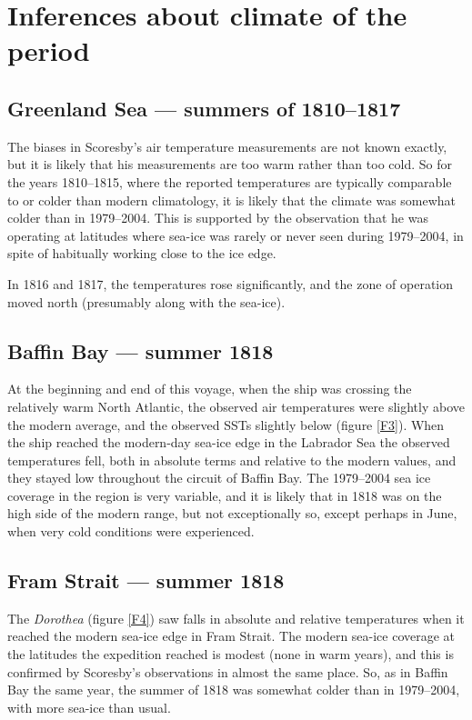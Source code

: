 \documentclass[CP]{copernicus}
\begin{document}
\section{Inferences about climate of the period}

\subsection{Greenland Sea --- summers of 1810--1817}

The biases in Scoresby's air temperature measurements are not known exactly, but it is likely that his measurements are too warm rather than too cold. So for the years 1810--1815, where the reported temperatures are typically comparable to or colder than modern climatology, it is likely that the climate was somewhat colder than in 1979--2004. This is supported by the observation that he was operating at latitudes where sea-ice was rarely or never seen during 1979--2004, in spite of habitually working close to the ice edge.

In 1816 and 1817, the temperatures rose significantly, and the zone of operation moved north (presumably along with the sea-ice).

\subsection{Baffin Bay --- summer 1818}

At the beginning and end of this voyage, when the ship was crossing the relatively warm North Atlantic, the observed air temperatures were slightly above the modern average, and the observed SSTs slightly below (figure \ref{F3}). When the ship reached the modern-day sea-ice edge in the Labrador Sea the observed temperatures fell, both in absolute terms and relative to the modern values, and they stayed low throughout the circuit of Baffin Bay. The 1979--2004 sea ice coverage in the region is very variable, and it is likely that in 1818 was on the high side of the modern range, but not exceptionally so, except perhaps in June, when very cold conditions were experienced.

\subsection{Fram Strait --- summer 1818}

The {\it Dorothea} (figure \ref{F4}) saw falls in absolute and relative temperatures when it reached the modern sea-ice edge in Fram Strait. The modern sea-ice coverage at the latitudes the expedition reached is modest (none in warm years), and this is confirmed by Scoresby's observations in almost the same place. So, as in Baffin Bay the same year, the summer of 1818 was somewhat colder than in 1979--2004, with more sea-ice than usual.
\end{document}
